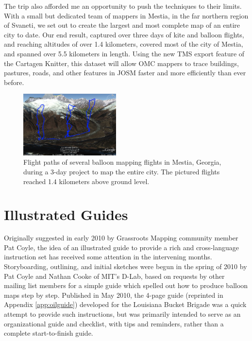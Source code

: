 \documentclass[11pt,oneside,notitlepage]{report}
\begin{document}
The trip also afforded me an opportunity to push the techniques to their limits. With a small but dedicated team of mappers in Mestia, in the far northern region of Svaneti, we set out to create the largest and most complete map of an entire city to date. Our end result, captured over three days of kite and balloon flights, and reaching altitudes of over 1.4 kilometers, covered most of the city of Mestia, and spanned over 5.5 kilometers in length. Using the new \ac{TMS} export feature of the Cartagen Knitter, this dataset will allow \ac{OMC} mappers to trace buildings, pastures, roads, and other features in \ac{JOSM} faster and more efficiently than ever before. 

\begin{figure}
	\begin{flushright}
		\includegraphics[width=0.45\textwidth]{images/mestia-gps.png}
		\caption{Flight paths of several balloon mapping flights in Mestia, Georgia, during a 3-day project to map the entire city. The pictured flights reached 1.4 kilometers above ground level.}
	\end{flushright}
\end{figure}

\section{Illustrated Guides}
\label{sec:guide}

Originally suggested in early 2010 by Grassroots Mapping community member Pat Coyle, the idea of an illustrated guide to provide a rich and cross-language instruction set has received some attention in the intervening months. Storyboarding, outlining, and initial sketches were begun in the spring of 2010 by Pat Coyle and Nathan Cooke of MIT's D-Lab, based on requests by other mailing list members for a simple guide which spelled out how to produce balloon maps step by step. Published in May 2010, the 4-page guide (reprinted in Appendix \ref{app:oilguide}) developed for the Louisiana Bucket Brigade was a quick attempt to provide such instructions, but was primarily intended to serve as an organizational guide and checklist, with tips and reminders, rather than a complete start-to-finish guide.
\end{document}

